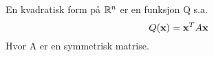 En kvadratisk form på $\mathbb{R}^n$ er en funksjon Q s.a.
$$Q(\mathbf{x}) = \mathbf{x}^T A \mathbf{x}$$
Hvor A er en symmetrisk matrise.
